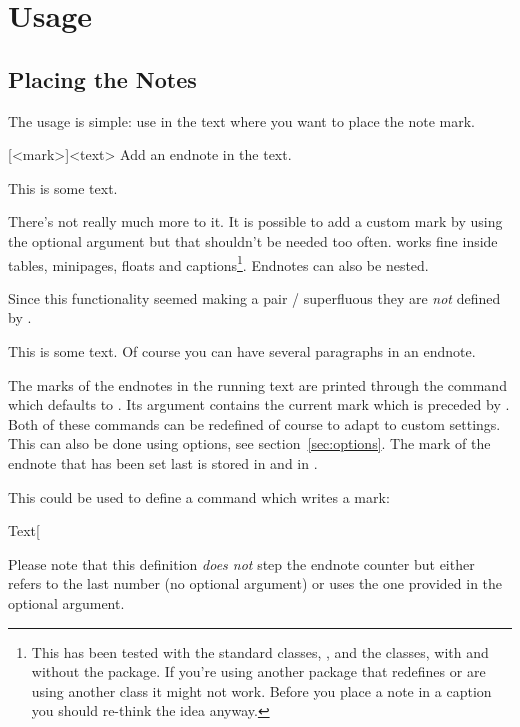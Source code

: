 \documentclass[toc=bib,toc=index]{cnpkgdoc}
\begin{document}
\section{Usage}
\subsection{Placing the Notes}
The usage is simple: use  in the text where you want to place the
note mark.
\begin{beschreibung}
  [<mark>]{<text>}\newline
    Add an endnote in the text.
\end{beschreibung}
\begin{beispiel}
  This is some text.
\end{beispiel}
There's not really much more to it.  It is possible to add a custom mark by
using the optional argument but that shouldn't be needed too often.
 works fine inside tables, minipages, floats and
captions\footnote{This has been tested with the standard classes,
  , and the  classes, with and without the
   package.  If you're using another package that redefines
   or are using another class it might not work.  Before you
  place a note in a caption you should re-think the idea anyway.}.  Endnotes
can also be nested.

Since this functionality seemed making a pair
/ superfluous they are \emph{not} defined by
\enotez.
\begin{beispiel}
  This is some text.
  Of course you can have several paragraphs\endnote{\kant[1-3]} in an endnote.
\end{beispiel}

The marks of the endnotes in the running text are printed through the command
 which defaults to .  Its argument
contains the current mark which is preceded by .  Both of
these commands can be redefined of course to adapt to custom settings.  This
can also be done using options, see section~\ref{sec:options}.  The mark of
the endnote that has been set last is stored in  and in
.

This could be used to define a command which writes a mark:
\begin{beispiel}
  \makeatletter
  \def\endnotemark{\@ifnextchar[{\@endnotemark}{\@endnotemark[\theendnote]}}
  \def\@endnotemark[#1]{\enotezwritemark{\enmarkstyle#1}}
  \makeatother
  Text\endnotemark
\end{beispiel}
Please note that this definition \emph{does not} step the endnote counter but
either refers to the last number (no optional argument) or uses the one
provided in the optional argument.
\end{document}
